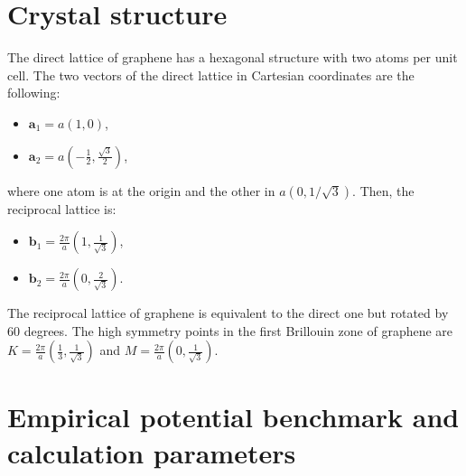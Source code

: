 \section{Crystal structure}

The direct lattice of graphene has a hexagonal structure with two atoms per unit cell. The two vectors of the direct 
lattice in Cartesian coordinates are the following:
\begin{itemize}
 \item $\mathbf{a}_{1}=a(1,0)$,
 \item $\mathbf{a}_{2}=a\left(-\frac{1}{2},\frac{\sqrt{3}}{2}\right)$,
\end{itemize}
where one atom is at the origin and the other in $a(0,1/\sqrt{3})$. Then, the reciprocal lattice is:
\begin{itemize}
 \item $\mathbf{b}_{1}=\frac{2\pi}{a}\left(1,\frac{1}{\sqrt{3}}\right)$,
 \item $\mathbf{b}_{2}=\frac{2\pi}{a}\left(0,\frac{2}{\sqrt{3}}\right)$.
\end{itemize}
The reciprocal lattice of graphene is equivalent to the direct one but rotated by $60$ degrees. The high symmetry 
points in the first Brillouin zone of graphene are $K=\frac{2\pi}{a}\left(\frac{1}{3},\frac{1}{\sqrt{3}}\right)$ and 
$M=\frac{2\pi}{a}\left(0,\frac{1}{\sqrt{3}}\right)$. 

\section{Empirical potential benchmark and calculation parameters}


